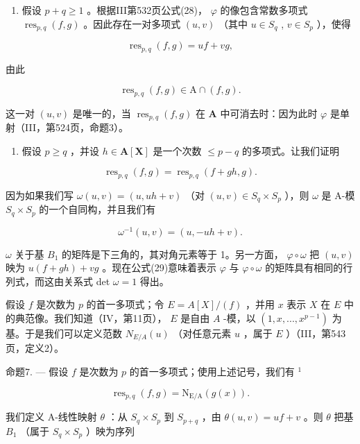 \begin{enumerate}
\def\labelenumi{\arabic{enumi})}
\setcounter{enumi}{3}
\tightlist
\item
  假设 \(p + q \geqslant 1\) 。根据III第532页公式(28)， \(\varphi\) 的像包含常数多项式 \(\operatorname{res}_{p,q}(f, g)\) 。因此存在一对多项式 \((u, v)\) （其中 \(u \in S_q\) , \(v \in S_p\) ），使得
\end{enumerate}

\[
\operatorname{res} _ {p, q} (f, g) = u f + v g,
\]

由此

\[
\operatorname{res} _ {p, q} (f, g) \in \mathrm{A} \cap (f, g).
\]

这一对 \((u, v)\) 是唯一的，当 \(\operatorname{res}_{p,q}(f, g)\) 在 \(\mathbf{A}\) 中可消去时：因为此时 \(\varphi\) 是单射（III，第524页，命题3）。

\begin{enumerate}
\def\labelenumi{\arabic{enumi})}
\setcounter{enumi}{4}
\tightlist
\item
  假设 \(p \geqslant q\) ，并设 \(h \in \mathbf{A}[\mathbf{X}]\) 是一个次数 \(\leqslant p - q\) 的多项式。让我们证明
\end{enumerate}

\[
\operatorname{res} _ {p, q} (f, g) = \operatorname{res} _ {p, q} (f + g h, g).\tag{29}
\]

因为如果我们写 \(\omega(u, v) = (u, uh + v)\) （对 \((u, v) \in S_q \times S_p\) ），则 \(\omega\) 是 A-模 \(S_q \times S_p\) 的一个自同构，并且我们有

\[
\omega^ {- 1} (u, v) = (u, - u h + v).
\]

\(\omega\) 关于基 \(B_{1}\) 的矩阵是下三角的，其对角元素等于 1。另一方面， \(\varphi \circ \omega\) 把 \((u, v)\) 映为 \(u(f + gh) + vg\) 。现在公式(29)意味着表示 \(\varphi\) 与 \(\varphi \circ \omega\) 的矩阵具有相同的行列式，而这由关系式 det \(\omega = 1\) 得出。

假设 \(f\) 是次数为 \(p\) 的首一多项式；令 \(E = A[X]/(f)\) ，并用 \(x\) 表示 \(X\) 在 \(E\) 中的典范像。我们知道（IV，第11页）， \(E\) 是自由 \(A\) -模，以 \((1, x, ..., x^{p-1})\) 为基。于是我们可以定义范数 \(N_{E/A}(u)\) （对任意元素 \(u\) ，属于 \(E\) ）（III，第543页，定义2）。

命题7. --- 假设 \(f\) 是次数为 \(p\) 的首一多项式；使用上述记号，我们有 \(^{1}\)

\[
\operatorname{res} _ {p, q} (f, g) = \mathrm{N} _ {\mathrm{E/A}} (g (x)).\tag{30}
\]

我们定义 A-线性映射 \(\theta\) ：从 \(S_q \times S_p\) 到 \(S_{p+q}\) ，由 \(\theta(u, v) = uf + v\) 。则 \(\theta\) 把基 \(B_1\) （属于 \(S_q \times S_p\) ）映为序列


